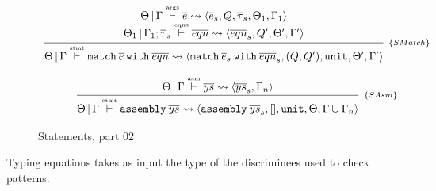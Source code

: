 \documentclass[a4paper, 11pt]{article}
\begin{document}
\begin{figure}[H]
  \[
    \begin{array}{c}
      \infer[_{\{SMatch\}}]
            {\Theta\,|\,\Gamma \typing{stmt} \mathtt{match}\:\overline{e}\:\mathtt{with}\:\overline{eqn} \leadsto\langle \mathtt{match}\:\overline{e}_s\:\mathtt{with}\:\overline{eqn}_s, (Q,Q'), \unit, \Theta', \Gamma'\rangle}
            {\begin{array}{c}
              \Theta\,|\,\Gamma \typing{args}\overline{e}\leadsto \langle \overline{e}_s, Q, \overline{\tau}_s, \Theta_1, \Gamma_1\rangle
              \\
              \Theta_1\,|\,\Gamma_1 ; \overline{\tau}_s\typing{eqns} \overline{eqn} \leadsto \langle \overline{eqn}_s, Q', \Theta', \Gamma' \rangle 
             \end{array}}
             \\ \\ 
             \infer[_{\{SAsm\}}]
                   {\Theta\,|\,\Gamma \typing{stmt} \mathtt{assembly}\:\overline{ys} \leadsto \langle \mathtt{assembly}\:\overline{ys}_s, [], \unit, \Theta, \Gamma \cup \Gamma_n \rangle}
                   {\Theta\,|\,\Gamma \typing{asm} \overline{ys} \leadsto \langle \overline{ys}_s, \Gamma_n \rangle}
    \end{array}
  \]
  \centering
  \caption{Statements, part 02}
  \label{fig:typingmatch}
\end{figure}

Typing equations takes as input the type of the discriminees used to check 
patterns.
\end{document}
